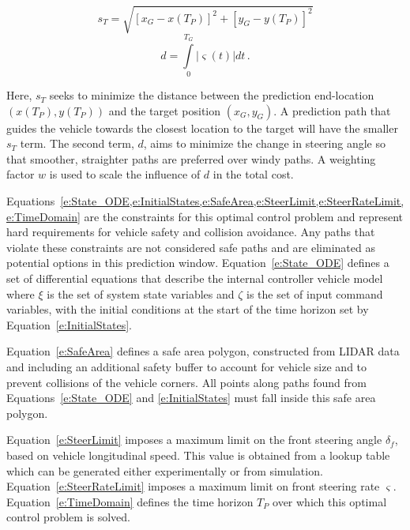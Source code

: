 \documentclass[12pt,onecolumn]{report}
\begin{document}
\begin{equation}\label{e:DistanceCost}
s_T = \sqrt{\left[ x_G - x\left(T_P\right)\right]^2 + \left[y_G - y\left(T_P\right)\right]^2 }
\end{equation}
\begin{equation}\label{e:TurningCost}
d = \int \limits_0^{T_G} \left|\varsigma\left(t\right)\right| dt \,.
\end{equation}

Here, $s_{T}$ seeks to minimize the distance between the prediction end-location $\left(x\left(T_P\right), y\left(T_P\right)\right)$ and the target position $\left(x_G, y_G\right)$. A prediction path that guides the vehicle towards the closest location to the target will have the smaller $s_{T}$ term. The second term, $d$, aims to minimize the change in steering angle so that smoother, straighter paths are preferred over windy paths. A weighting factor $w$ is used to scale the influence of $d$ in the total cost.

Equations~\cref{e:State_ODE,e:InitialStates,e:SafeArea,e:SteerLimit,e:SteerRateLimit,e:TimeDomain} are the constraints for this optimal control problem and represent hard requirements for vehicle safety and collision avoidance. Any paths that violate these constraints are not considered safe paths and are eliminated as potential options in this prediction window. Equation~\eqref{e:State_ODE} defines a set of differential equations that describe the internal controller vehicle model where $\xi$ is the set of system state variables and $\zeta$ is the set of input command variables, with the initial conditions at the start of the time horizon set by Equation~\eqref{e:InitialStates}.

Equation~\eqref{e:SafeArea} defines a safe area polygon, constructed from LIDAR data and including an additional safety buffer to account for vehicle size and to prevent collisions of the vehicle corners.  All points along paths found from Equations~\eqref{e:State_ODE} and \eqref{e:InitialStates} must fall inside this safe area polygon.

Equation~\eqref{e:SteerLimit} imposes a maximum limit on the front steering angle $\delta_f$, based on vehicle longitudinal speed. This value is obtained from a lookup table which can be generated either experimentally or from simulation. Equation~\eqref{e:SteerRateLimit} imposes a maximum limit on front steering rate $\varsigma$. Equation~\eqref{e:TimeDomain} defines the time horizon $T_P$ over which this optimal control problem is solved.
 
\end{document}
